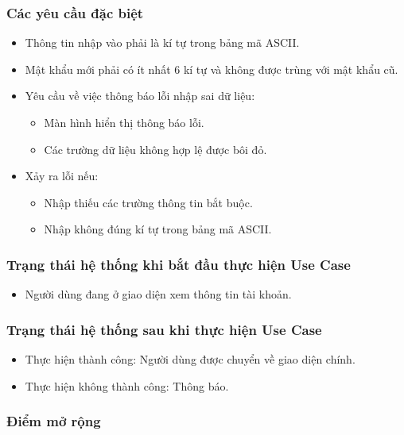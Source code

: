\subsubsection{Các yêu cầu đặc biệt}
\begin{itemize}
    \item Thông tin nhập vào phải là kí tự trong bảng mã ASCII.
    \item Mật khẩu mới phải có ít nhất 6 kí tự và không được trùng với mật khẩu cũ.
    \item Yêu cầu về việc thông báo lỗi nhập sai dữ liệu:
    \begin{itemize}
        \item Màn hình hiển thị thông báo lỗi.
        \item Các trường dữ liệu không hợp lệ được bôi đỏ.
    \end{itemize}
    \item Xảy ra lỗi nếu:
    \begin{itemize}
        \item Nhập thiếu các trường thông tin bắt buộc.
        \item Nhập không đúng kí tự trong bảng mã ASCII.
    \end{itemize}
\end{itemize}

\subsubsection{Trạng thái hệ thống khi bắt đầu thực hiện Use Case}
\begin{itemize}
    \item Người dùng đang ở giao diện xem thông tin tài khoản.
\end{itemize}

\subsubsection{Trạng thái hệ thống sau khi thực hiện Use Case}
\begin{itemize}
    \item Thực hiện thành công: Người dùng được chuyển về giao diện chính.
    \item Thực hiện không thành công: Thông báo.
\end{itemize}

\subsubsection{Điểm mở rộng}